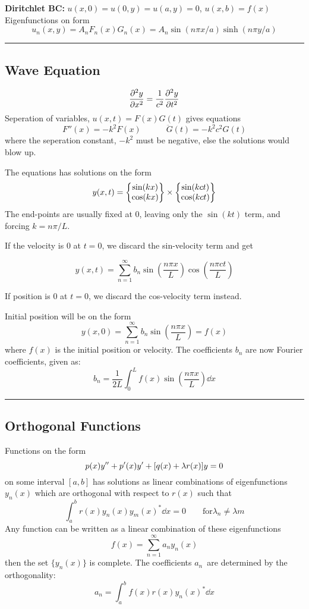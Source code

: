 \documentclass[10pt,a4paper]{article}
\newcommand{\oneinfsum}{\sum_{n=1}^{\infty}}
\newcommand{\holine}{\rule{286pt}{1pt}}
\begin{document}
\begin{multicols}{2}
\textbf{Diritchlet BC:} $u(x,0) = u(0,y) = u(a,y) = 0$, $u(x,b) = f(x)$
Eigenfunctions on form
\[
    u_n(x,y) = A_nF_n(x)G_n(x) = A_n\sin(n\pi x/a)\sinh(n\pi y/a)
\]


\holine
\subsection*{Wave Equation}
\[
    \pdv[2]{y}{x} = \frac{1}{c^2}\pdv[2]{y}{t}
\]
Seperation of variables, $u(x,t) = F(x)G(t)$ gives equations
\[
    F''(x) = -k^2F(x) \quad\quad\quad \ddot{G}(t) = -k^2c^2G(t)
\]
where the seperation constant, $-k^2$ must be negative, else the solutions would blow up.

The equations has solutions on the form
\[
    y(x,t) = \qty{\begin{matrix} \sin(kx) \\ \cos(kx) \end{matrix}} \times \qty{\begin{matrix} \sin(kct) \\ \cos(kct) \end{matrix}}
\]
The end-points are usually fixed at 0, leaving only the $\sin(kt)$ term, and forcing $k=n\pi/L$.

If the velocity is 0 at $t=0$, we discard the sin-velocity term and get

\[
    y(x,t) = \oneinfsum b_n\sin(\frac{n\pi x}{L})\cos(\frac{n\pi c t}{L})
\]

If position is 0 at $t=0$, we discard the cos-velocity term instead.

Initial position will be on the form
\[
    y(x,0) = \oneinfsum b_n \sin(\frac{n\pi x}{L}) = f(x)
\]
where $f(x)$ is the initial position or velocity. The coefficients $b_n$ are now Fourier coefficients, given as:
\[
    b_n = \frac{1}{2L}\int_{0}^{L} f(x)\sin(\frac{n\pi x}{L}) \dd{x}
\]



\holine
\subsection*{Orthogonal Functions}
Functions on the form
\[
    p(x)y'' + p'(x)y' + \qty[q(x) + \lambda r(x)]y = 0
\]
on some interval $[a,b]$ has solutions as linear combinations of eigenfunctions $y_n(x)$ which are orthogonal with respect to $r(x)$ such that
\[
    \int_a^b r(x)y_n(x)y_m(x)^* \dd{x} = 0 \quad\quad \text{for} \lambda_n \neq \lambda{m}
\]
Any function can be written as a linear combination of these eigenfunctions
\[
    f(x) = \sum_{n=1}^\infty a_n y_n(x)
\]
then the set $\{y_n(x)\}$ is complete. The coefficients $a_n$ are determined by the orthogonality:
\[
    a_n = \int_a^b f(x)r(x)y_n(x)^* \dd{x}
\]


\newpage





\end{multicols}
\end{document}
